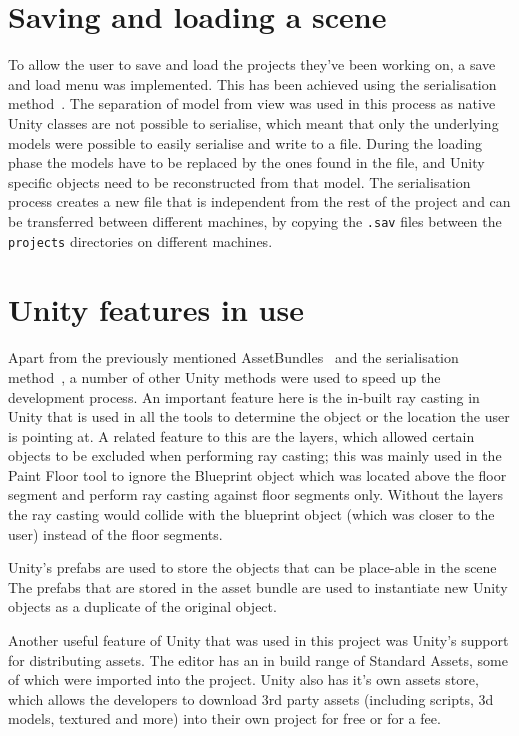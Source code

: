 \section{Saving and loading a scene}
\label{sec:saving}
To allow the user to save and load the projects they've been working on, a save and load menu was implemented. This has been achieved using the serialisation method~\cite{unity:serialization}. The separation of model from view was used in this process as native Unity classes are not possible to serialise, which meant that only the underlying models were possible to easily serialise and write to a file. During the loading phase the models have to be replaced by the ones found in the file, and Unity specific objects need to be reconstructed from that model. The serialisation process creates a new file that is independent from the rest of the project and can be transferred between different machines, by copying the \verb|.sav| files between the \verb|projects| directories on different machines.

\section{Unity features in use}
Apart from the previously mentioned AssetBundles~\cite{unity:assetbundle} and the serialisation method~\cite{unity:serialization}, a number of other Unity methods were used to speed up the development process. An important feature here is the in-built ray casting in Unity that is used in all the tools to determine the object or the location the user is pointing at. A related feature to this are the layers, which allowed certain objects to be excluded when performing ray casting; this was mainly used in the Paint Floor tool to ignore the Blueprint object which was located above the floor segment and perform ray casting against floor segments only. Without the layers the ray casting would collide with the blueprint object (which was closer to the user) instead of the floor segments.

Unity's prefabs are used to store the objects that can be place-able in the scene The prefabs that are stored in the asset bundle are used to instantiate new Unity objects as a duplicate of the original object.

Another useful feature of Unity that was used in this project was Unity's support for distributing assets. The editor has an in build range of Standard Assets, some of which were imported into the project. Unity also has it's own assets store, which allows the developers to download 3rd party assets (including scripts, 3d models, textured and more) into their own project for free or for a fee.

